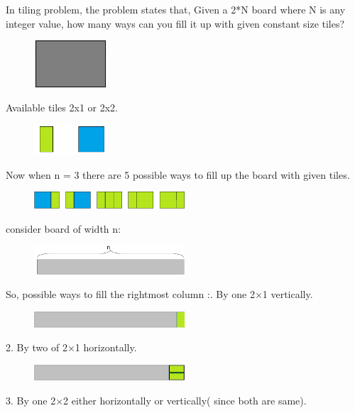 \documentclass[12pt]{article}
\begin{document}
{In tiling problem, the problem states that,\newline
Given a 2*N board where  N is any integer value, how many ways can you fill it up with given constant size tiles? 
\begin{figure}[H]
\centering
\includegraphics[width=0.24\textwidth]{tile_2xn.png}
\end{figure}
Available tiles 2x1 or 2x2.
\begin{figure}[H]
\centering
\includegraphics[width=0.25\textwidth]{2x1_2x2.png}
\end{figure}
Now when n = 3 there are 5 possible ways to fill up the board with given tiles. 
\begin{figure}[H]
\centering
\includegraphics[width=0.5\textwidth]{n3_5.png}
\end{figure}
consider board of width n:
\begin{figure}[H]
\centering
\includegraphics[width=0.5\textwidth]{fn.png}
\end{figure}
So, possible ways to fill the rightmost column :. By one 2×1 vertically.
\begin{figure}[H]
\centering
\includegraphics[width=0.5\textwidth]{f1_2x1.png}
\end{figure}
2. By two of 2×1 horizontally.
\begin{figure}[H]
\centering
\includegraphics[width=0.5\textwidth]{f2_2x1.png}
\end{figure}
3. By one 2×2 either horizontally or vertically( since both are same).
}
\end{document}
